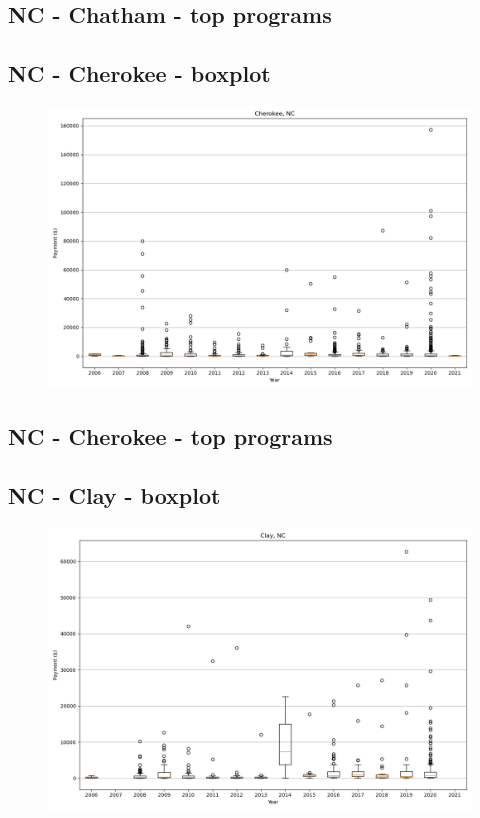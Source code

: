 \subsection*{NC - Chatham - top programs}

\newpage
\subsection*{NC - Cherokee - boxplot}
\begin{figure}[h]
\centering
\includegraphics[width=7in]{../output/boxplots/counties/Cherokee-NC_boxplot.png}
\end{figure}


\subsection*{NC - Cherokee - top programs}

\newpage
\subsection*{NC - Clay - boxplot}
\begin{figure}[h]
\centering
\includegraphics[width=7in]{../output/boxplots/counties/Clay-NC_boxplot.png}
\end{figure}


